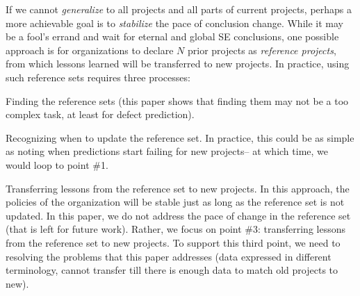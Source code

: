 If we cannot {\em generalize} to all projects and all parts
of current projects, perhaps a more achievable goal is to {\em stabilize} the pace of conclusion change. 
While it may be 
a fool's errand  and wait for  eternal and global SE
conclusions, one possible approach is for organizations
to declare $N$ prior projects as {\em reference projects},
from which lessons learned will be transferred to new projects.
In practice, using such reference sets requires three processes:
\squishlist

\item Finding the reference sets (this paper shows that finding
  them may not be a too complex task, at least for defect prediction).
  \item Recognizing when to update  the reference set. In practice,
  this could be as simple as noting when predictions start failing for new projects-- at which time, we would loop to point \#1.
\item Transferring
  lessons from the reference set to new projects.  
\squishend
In this approach, the policies of the organization will be
stable just as long as the reference set is not updated.
In this paper, we do not address the pace of change in the reference set
(that is left for future work).
Rather, we focus on point \#3: transferring lessons from
the reference set to new projects. To support this third point,
we need to  resolving the problems
  that this paper addresses (data expressed in different terminology,
  cannot transfer till there is enough data to match old projects to new).

  

